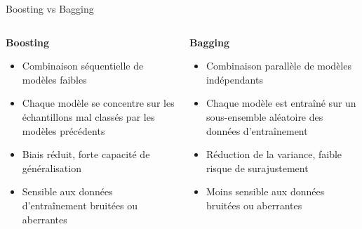 \documentclass{beamer}
\begin{document}
\begin{frame}{Boosting vs Bagging}
	\begin{columns}
		\begin{column}{0.5\textwidth}
			\textbf{Boosting}
			\begin{itemize}
				\item Combinaison séquentielle de modèles faibles
				\item Chaque modèle se concentre sur les échantillons mal classés par les modèles précédents
				\item Biais réduit, forte capacité de généralisation
				\item Sensible aux données d'entraînement bruitées ou aberrantes
			\end{itemize}
		\end{column}
		\begin{column}{0.5\textwidth}
			\textbf{Bagging}
			\begin{itemize}
				\item Combinaison parallèle de modèles indépendants
				\item Chaque modèle est entraîné sur un sous-ensemble aléatoire des données d'entraînement
				\item Réduction de la variance, faible risque de surajustement
				\item Moins sensible aux données bruitées ou aberrantes
			\end{itemize}
		\end{column}
	\end{columns}
\end{frame}
\end{document}
